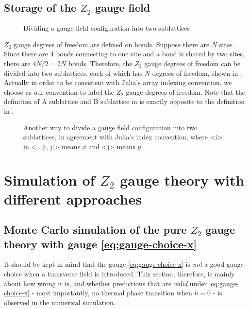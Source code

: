 \documentclass[hyperref, a4paper]{article}
\newcommand*{\Ztwo}{\texorpdfstring{$\mathbb{Z}_2$ }{Z2 }}
\def\texttt#1{<#1>}%
\def\mathbb#1{#1}%
\begin{document}
\subsection{Storage of the \Ztwo gauge field}

\begin{figure}
    \centering
    
    \caption{Dividing a gauge field configuration into two sublattices}
    \label{fig:z2-dividing}
\end{figure}

\Ztwo gauge degrees of freedom are defined on bonds. 
Suppose there are $N$ sites. Since there are 4 bonds connecting to one site and a bond is shared by two sites,
there are $4 N / 2 = 2 N$ bonds.
Therefore, the \Ztwo gauge degrees of freedom can be divided into two sublattices, each of which has $N$ degrees of freedom, shown in .
Actually in order to be consistent with Julia's array indexing convention, we choose  as our convention to label the \Ztwo gauge degrees of freedom.
Note that the definition of A sublattice and B sublattice in  is exactly opposite to the definition in .

\begin{figure}
    \centering
    
    \caption{Another way to divide a gauge field configuration into two sublattices, in agreement with Julia's index convention, where \texttt{i} in \texttt{...[i, j]} means $x$ and \texttt{j} means $y$.}
    \label{fig:z2-dividing-real}
\end{figure}


\section{Simulation of \Ztwo gauge theory with different approaches}

\subsection{Monte Carlo simulation of the pure \Ztwo gauge theory with gauge \eqref{eq:gauge-choice-x}}

It should be kept in mind that the gauge \eqref{eq:gauge-choice-x} is \emph{not} a good gauge choice when a transverse field is introduced.
This section, therefore, is mainly about how wrong it is, and whether predictions that are \emph{valid} under \eqref{eq:gauge-choice-x} - most importantly, no thermal phase transition when $h=0$ - is observed in the numerical simulation.
\end{document}
